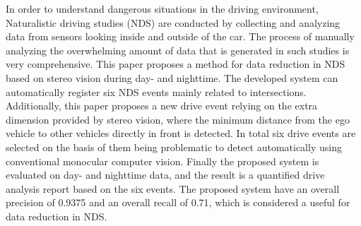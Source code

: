 In order to understand dangerous situations in the driving environment, Naturalistic driving studies (NDS) are conducted by collecting and analyzing data from sensors looking inside and outside of the car. The process of manually analyzing the overwhelming amount of data that is generated in such studies is very comprehensive. This paper proposes a method for data reduction in NDS based on stereo vision during day- and nighttime. The developed system can automatically register six NDS events mainly related to intersections. Additionally, this paper proposes a new drive event relying on the extra dimension provided by stereo vision, where the minimum distance from the ego vehicle to other vehicles directly in front is detected.
In total six drive events are selected on the basis of them being problematic to detect automatically using conventional monocular computer vision. 
Finally the proposed system is evaluated on day- and nighttime data, and the result is a quantified drive analysis report based on the six events. The proposed system have an overall precision of 0.9375 and an overall recall of 0.71, which is considered a useful for data reduction in NDS.
